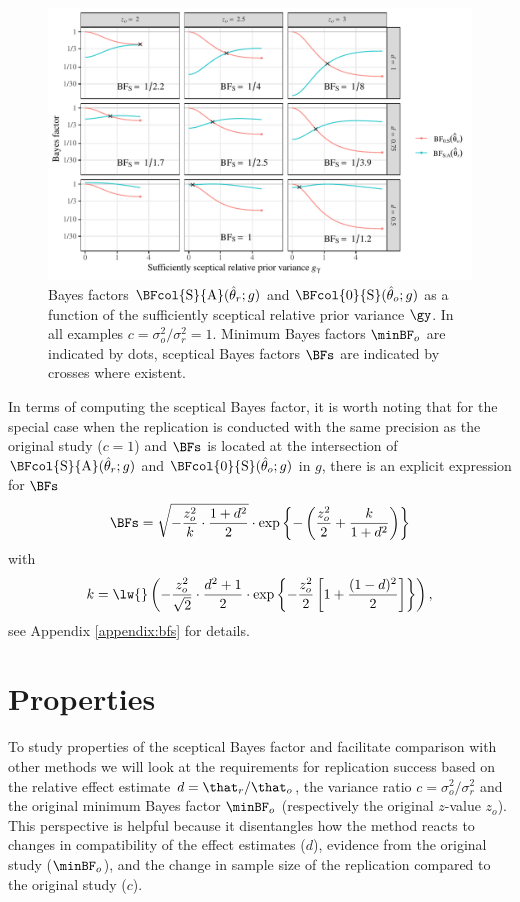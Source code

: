 \begin{figure}[!htb]
\begin{knitrout}
\color{fgcolor}
\includegraphics[width=\maxwidth]{images/paper1/plot-BFs-1}
\end{knitrout}
\caption{Bayes factors $\BFcol{\mathrm{S}}{\mathrm{A}}(\hat{\theta}_r; g)$ and
$\BFcol{0}{\mathrm{S}}(\hat{\theta}_o; g)$ as a function of the sufficiently
sceptical relative prior variance $\gy$. In all examples
$c = \sigma^2_o/\sigma^2_r = 1$. Minimum Bayes factors $\minBF_o$ are indicated
by dots, sceptical Bayes factors $\BFs$ are indicated by crosses where existent.}
\label{fig1:bfs}
\end{figure}


In terms of computing the sceptical Bayes factor, it is worth noting that for
the special case when the replication is conducted with the same precision as
the original study ($c = 1$) and $\BFs$ is located at the intersection of
$\BFcol{\mathrm{S}}{\mathrm{A}}(\hat{\theta}_r; g)$ and
$\BFcol{0}{\mathrm{S}}(\hat{\theta}_o; g)$ in $g$, there is an explicit expression
for $\BFs$
\begin{align}
  \label{eq1:BFsc1}
  \BFs =
  \sqrt{-\frac{z^2_{o}}{k} \cdot \frac{1 + d^{2}}{2}} \cdot
  \exp\left\{-\left(\frac{z_o^2}{2} + \frac{k}{1 + d^2}\right)\right\}
\end{align}
with
$$k = \lw{}\left(-\frac{z_{o}^{2}}{\sqrt{2}} \cdot \frac{d^{2} + 1}{2} \cdot \exp\left\{-\frac{z_o^2}{2}
  \left[1 + \frac{(1 -
d)^2}{2}\right]\right\}\right),$$ see Appendix \ref{appendix:bfs} for details.


\section{Properties}
\label{sec1:comparison}
To study properties of the sceptical Bayes factor and facilitate comparison with
other methods we will look at the requirements for replication success based on
the relative effect estimate $d = \that_{r}/\that_{o}$, the variance ratio
$c = \sigma^{2}_{o}/\sigma^{2}_{r}$ and the original minimum Bayes factor
$\minBF_{o}$ (respectively the original $z$-value $z_{o}$). This perspective is
helpful because it disentangles how the method reacts to changes in
compatibility of the effect estimates ($d$), evidence from the original study
($\minBF_{o}$), and the change in sample size of the replication compared to the
original study ($c$).

